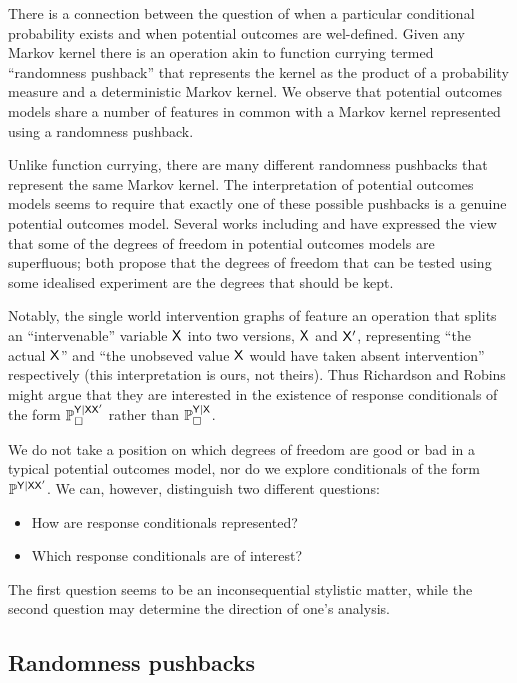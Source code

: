 There is a connection between the question of when a particular conditional probability exists and when potential outcomes are wel-defined. Given any Markov kernel there is an operation akin to function currying termed ``randomness pushback'' that represents the kernel as the product of a probability measure and a deterministic Markov kernel. We observe that potential outcomes models share a number of features in common with a Markov kernel represented using a randomness pushback.

Unlike function currying, there are many different randomness pushbacks that represent the same Markov kernel. The interpretation of potential outcomes models seems to require that exactly one of these possible pushbacks is a genuine potential outcomes model. Several works including \citet{dawid_causal_2000} and \citet{richardson2013single} have expressed the view that some of the degrees of freedom in potential outcomes models are superfluous; both propose that the degrees of freedom that can be tested using some idealised experiment are the degrees that should be kept.

Notably, the single world intervention graphs of \citet{richardson2013single} feature an operation that splits an ``intervenable'' variable $\mathsf{X}$ into two versions, $\mathsf{X}$ and $\mathsf{X}'$, representing ``the actual $\mathsf{X}$'' and ``the unobseved value $\mathsf{X}$ would have taken absent intervention'' respectively (this interpretation is ours, not theirs). Thus Richardson and Robins might argue that they are interested in the existence of response conditionals of the form $\mathbb{P}_\square^{\mathsf{Y}|\mathsf{X}\mathsf{X}'}$ rather than $\mathbb{P}_{\square}^{\mathsf{Y}|\mathsf{X}}$. 

We do not take a position on which degrees of freedom are good or bad in a typical potential outcomes model, nor do we explore conditionals of the form $\mathbb{P}^{\mathsf{Y}|\mathsf{X}\mathsf{X}'}$. We can, however, distinguish two different questions:

\begin{itemize}
    \item How are response conditionals represented?
    \item Which response conditionals are of interest?
\end{itemize}

The first question seems to be an inconsequential stylistic matter, while the second question may determine the direction of one's analysis.

\subsection{Randomness pushbacks}


